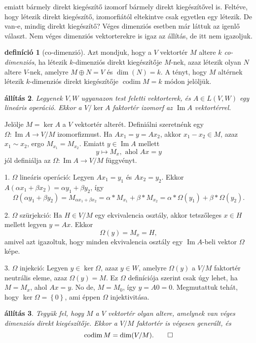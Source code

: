 \documentclass[a4paper, showtrims]{memoir}
\makeatletter
\renewenvironment{proof}[1][\proofname]
    {\par\pushQED{\qed}%
    \normalfont \topsep6\p@\@plus6\p@\relax
    \trivlist
    \item[\hskip\labelsep
        \itshape
    #1\@addpunct{:}]\ignorespaces}
    {\popQED\endtrivlist\@endpefalse}
\theoremstyle{plain}
\newtheorem{proposition}{állítás}[chapter]
\theoremstyle{remark}
\theoremstyle{definition}
\newtheorem{definition}[proposition]{definíció}
\DeclareMathOperator{\codim}{codim}
\DeclareMathOperator{\im}{Im}
\makeatother
\begin{document}
emiatt bármely direkt kiegészítő izomorf bármely direkt kiegészítővel is.
Feltéve, hogy
létezik direkt kiegészítő, izomorfiától eltekintve csak egyetlen egy létezik.
De van-e, mindig direkt kiegészítő?
Véges dimenziós esetben már láttuk az igenlő választ.
Nem véges dimenziós vektorterekre is igaz az állítás, de itt nem igazoljuk.
\begin{definition}[co-dimenzió]
	Azt mondjuk, hogy a $V$ vektortér $M$ altere \emph{$k$ co-dimenziós},
	ha létezik $k$-dimenziós direkt kiegészítője $M$-nek,
	azaz létezik olyan $N$ altere $V$-nek, amelyre $M\oplus N=V$
	és $\dim(N)=k$.
	A tényt,
	hogy $M$ altérnek létezik $k$-dimenziós direkt kiegészítője
	$\codim M=k$ módon jelöljük.
\end{definition}
\begin{proposition}
	Legyenek $V,W$ ugyanazon test feletti vektorterek,
	és $A\in L\left( V,W \right)$ egy lineáris operáció.
	Ekkor a
	\(
	V/\ker A
	\)
	faktortér izomorf az $\im A$ vektortérrel.
\end{proposition}
\begin{proof}
	Jelölje $M=\ker A$ a $V$ vektortér alterét.
	Definiálni szeretnénk egy $\Omega:\im A\to V/M$ izomorfizmust.
	Ha $Ax_1=y=Ax_2$, akkor $x_1-x_2\in M$, azaz $x_1\sim x_2$, ergo $M_{x_1}=M_{x_2}$.
	Emiatt $y\in\im A$ mellett
	\[
		y\mapsto M_x, \text{ ahol } Ax=y
	\]
	jól definiálja az $\Omega:\im A\to V/M$ függvényt.

	1. $\Omega$ lineáris operáció:
	Legyen $Ax_1=y_1$ és $Ax_2=y_2$.
	Ekkor
	$A\left( \alpha x_1+\beta x_2 \right)=\alpha y_1+\beta y_2$, így
	\[
		\Omega\left( \alpha y_1+\beta y_2 \right)
		=
		M_{\alpha x_1+\beta x_2}
		=
		\alpha\ast M_{x_1}+\beta\ast M_{x_2}
		=
		\alpha\ast \Omega\left( y_1 \right)+\beta\ast\Omega\left( y_2 \right).
	\]

	2. $\Omega$ szürjekció:
	Ha $H\in V/M$ egy ekvivalencia osztály,
	akkor tetszőleges $x\in H$ mellett legyen $y=Ax$.
	Ekkor
	\[
		\Omega\left( y \right)=M_x=H,
	\]
	amivel azt igazoltuk,
	hogy minden ekvivalencia osztály egy $\im A$-beli vektor $\Omega$ képe.


	3. $\Omega$ injekció:
	Legyen $y\in\ker\Omega$, azaz $y\in W$, amelyre $\Omega\left( y \right)$ a $V/M$ faktortér neutrális eleme,
	azaz
	$\Omega\left( y \right)=M$.
	Ez $\Omega$ definíciója szerint csak úgy lehet, ha $M=M_x$, ahol $Ax=y$.
	No de, $M=M_0$, így $y=A0=0$.
	Megmutattuk tehát, hogy $\ker \Omega=\left\{ 0 \right\}$,
	ami éppen $\Omega$ injektivitása.
\end{proof}
\begin{proposition}
	Tegyük fel, hogy $M$ a $V$ vektortér olyan altere,
	amelynek van véges dimenziós direkt kiegészítője.
	Ekkor a $V/M$ faktortér is végesen generált, és
	\[
		\codim M=\dim(V/M).\qedhere
	\]
\end{proposition}
\end{document}
